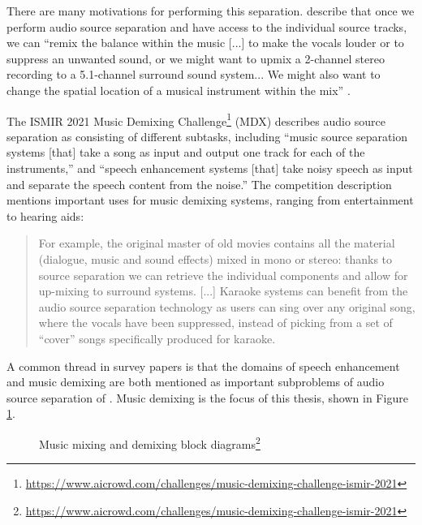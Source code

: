 \documentclass[report.tex]{subfiles}
\begin{document}
There are many motivations for performing this separation. \citeauthor{musicsepgood} describe that once we perform audio source separation and have access to the individual source tracks, we can ``remix the balance within the music [...] to make the vocals louder or to suppress an unwanted sound, or we might want to upmix a 2-channel stereo recording to a 5.1-channel surround sound system... We might also want to change the spatial location of a musical instrument within the mix'' \parencite[31]{musicsepgood}.

The ISMIR 2021 Music Demixing Challenge\footnote{\url{https://www.aicrowd.com/challenges/music-demixing-challenge-ismir-2021}} (MDX) \parencite{mdx21} describes audio source separation as consisting of different subtasks, including ``music source separation systems [that] take a song as input and output one track for each of the instruments,'' and ``speech enhancement systems [that] take noisy speech as input and separate the speech content from the noise.'' The competition description mentions important uses for music demixing systems, ranging from entertainment to hearing aids:

\begin{quote}
	For example, the original master of old movies contains all the material (dialogue, music and sound effects) mixed in mono or stereo: thanks to source separation we can retrieve the individual components and allow for up-mixing to surround systems. [...] Karaoke systems can benefit from the audio source separation technology as users can sing over any original song, where the vocals have been suppressed, instead of picking from a set of ``cover'' songs specifically produced for karaoke.
\end{quote}

A common thread in survey papers is that the domains of speech enhancement and music demixing are both mentioned as important subproblems of audio source separation of \parencite{musicsepintro1, musicmask}. Music demixing is the focus of this thesis, shown in Figure \ref{fig:mixingdiagrams}.

\begin{figure}[ht]
	\centering
        \begin{minipage}{1.\textwidth}
		\renewcommand\footnoterule{} %
		\renewcommand{\thempfootnote}{\fnsymbol{mpfootnote}}
		\centering
		\caption[Music mixing and demixing block diagrams]{Music mixing and demixing block diagrams\footnote{\url{https://www.aicrowd.com/challenges/music-demixing-challenge-ismir-2021}}}
		\label{fig:mixingdiagrams}
	\end{minipage}
\end{figure}
\end{document}
